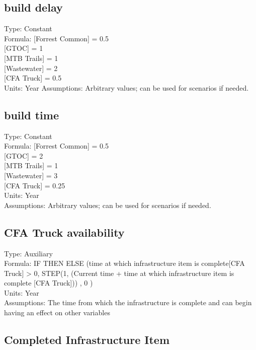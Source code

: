 \documentclass[
  11pt,
]{book}
\begin{document}
\hypertarget{build-delay}{%
\subsection{build delay}\label{build-delay}}

Type: Constant\\
Formula: {[}Forrest Common{]} = 0.5\\
{[}GTOC{]} = 1\\
{[}MTB Trails{]} = 1\\
{[}Wastewater{]} = 2\\
{[}CFA Truck{]} = 0.5\\
Units: Year
Assumptions: Arbitrary values; can be used for scenarios if needed.

\hypertarget{build-time}{%
\subsection{build time}\label{build-time}}

Type: Constant\\
Formula: {[}Forrest Common{]} = 0.5\\
{[}GTOC{]} = 2\\
{[}MTB Trails{]} = 1\\
{[}Wastewater{]} = 3\\
{[}CFA Truck{]} = 0.25\\
Units: Year\\
Assumptions: Arbitrary values; can be used for scenarios if needed.

\hypertarget{cfa-truck-availability}{%
\subsection{CFA Truck availability}\label{cfa-truck-availability}}

Type: Auxiliary\\
Formula: IF THEN ELSE (time at which infrastructure item is complete{[}CFA Truck{]} \textgreater{} 0, STEP(1, (Current time + time at which infrastructure item is complete {[}CFA Truck{]})) , 0 )\\
Units: Year\\
Assumptions: The time from which the infrastructure is complete and can begin having an effect on other variables

\hypertarget{completed-infrastructure-item}{%
\subsection{Completed Infrastructure Item}\label{completed-infrastructure-item}}
\end{document}
